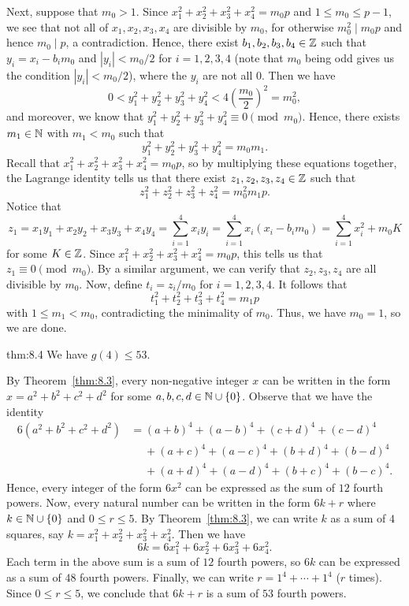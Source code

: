 \begin{pf}
    Next, suppose that $m_0 > 1$. Since $x_1^2 + x_2^2 + x_3^2 + x_4^2 
    = m_0p$ and $1 \leq m_0 \leq p-1$, we see that not all of 
    $x_1, x_2, x_3, x_4$ are divisible by $m_0$, for otherwise 
    $m_0^2 \mid m_0p$ and hence $m_0 \mid p$, a contradiction. Hence, 
    there exist $b_1, b_2, b_3, b_4 \in \mathbb{Z}$ such that $y_i = x_i 
    - b_i m_0$ and $|y_i| < m_0/2$ for $i = 1, 2, 3, 4$ (note that 
    $m_0$ being odd gives us the condition $|y_i| < m_0/2$), where 
    the $y_i$ are not all $0$. Then we have 
    \[ 0 < y_1^2 + y_2^2 + y_3^2 + y_4^2 < 4\left(\frac{m_0}{2}\right)^{\!2}
    = m_0^2, \] 
    and moreover, we know that $y_1^2 + y_2^2 + y_3^2 + y_4^2 \equiv 0 
    \pmod{m_0}$. Hence, there exists $m_1 \in \mathbb{N}$ with $m_1 < m_0$ such that 
    \[ y_1^2 + y_2^2 + y_3^2 + y_4^2 = m_0m_1. \] 
    Recall that $x_1^2 + x_2^2 + x_3^2 + x_4^2 = m_0p$, so by multiplying 
    these equations together, the Lagrange identity tells us that 
    there exist $z_1, z_2, z_3, z_4 \in \mathbb{Z}$ such that 
    \[ z_1^2 + z_2^2 + z_3^2 + z_4^2 = m_0^2 m_1 p. \] 
    Notice that 
    \[ z_1 = x_1y_1 + x_2y_2 + x_3y_3 + x_4y_4 = 
    \sum_{i=1}^4 x_i y_i = \sum_{i=1}^4 x_i(x_i - b_im_0) = 
    \sum_{i=1}^4 x_i^2 + m_0K \] 
    for some $K \in \mathbb{Z}$. Since $x_1^2 + x_2^2 + x_3^2 + x_4^2 = m_0p$, 
    this tells us that $z_1 \equiv 0 \pmod{m_0}$. By a similar argument, 
    we can verify that $z_2, z_3, z_4$ are all divisible by $m_0$. 
    Now, define $t_i = z_i/m_0$ for $i = 1, 2, 3, 4$. It follows that 
    \[ t_1^2 + t_2^2 + t_3^2 + t_4^2 = m_1p \] 
    with $1 \leq m_1 < m_0$, contradicting the minimality of $m_0$. 
    Thus, we have $m_0 = 1$, so we are done. 
\end{pf}

\begin{theo}{thm:8.4}
    We have $g(4) \leq 53$. 
\end{theo}
\begin{pf}
    By Theorem~\ref{thm:8.3}, every non-negative integer $x$ can be written 
    in the form $x = a^2 + b^2 + c^2 + d^2$ for some $a, b, c, d \in \mathbb{N} \cup \{0\}$. 
    Observe that we have the identity 
    \begin{align*}
        6(a^2 + b^2 + c^2 + d^2) 
        &= (a + b)^4 + (a - b)^4 + (c + d)^4 + (c - d)^4 \\ 
        &\quad\; + (a + c)^4 + (a - c)^4 + (b + d)^4 + (b - d)^4 \\ 
        &\quad\; + (a + d)^4 + (a - d)^4 + (b + c)^4 + (b - c)^4. 
    \end{align*}
    Hence, every integer of the form $6x^2$ can be expressed as the sum of 
    $12$ fourth powers. Now, every natural number can be written in the form 
    $6k + r$ where $k \in \mathbb{N} \cup \{0\}$ and $0 \leq r \leq 5$. By 
    Theorem~\ref{thm:8.3}, we can write $k$ as a sum of $4$ squares, 
    say $k = x_1^2 + x_2^2 + x_3^2 + x_4^2$. Then we have 
    \[ 6k = 6x_1^2 + 6x_2^2 + 6x_3^2 + 6x_4^2. \] 
    Each term in the above sum is a sum of $12$ fourth powers, so $6k$ 
    can be expressed as a sum of $48$ fourth powers. Finally, we can write 
    $r = 1^4 + \cdots + 1^4$ ($r$ times). Since $0 \leq r \leq 5$, 
    we conclude that $6k + r$ is a sum of $53$ fourth powers. 
\end{pf}